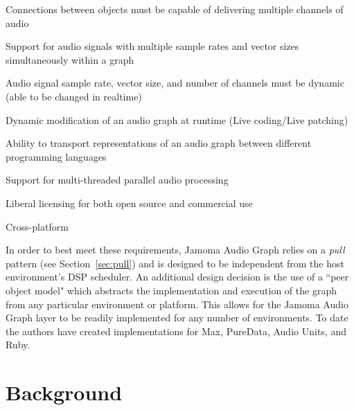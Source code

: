 \documentclass[twoside,a4paper]{article}
\newenvironment{packed_item}{
\begin{itemize}
  \setlength{\itemsep}{1pt}
  \setlength{\parskip}{0pt}
  \setlength{\parsep}{0pt}
}{\end{itemize}}
\begin{document}
\begin{packed_item}
	\item{Connections between objects must be capable of delivering multiple channels of audio}
	\item{Support for audio signals with multiple sample rates and vector sizes simultaneously within a graph}
	\item{Audio signal sample rate, vector size, and number of channels must be dynamic (able to be changed in realtime)}
	\item{Dynamic modification of an audio graph at runtime (Live coding/Live patching)}    
	\item{Ability to transport representations of an audio graph between different programming languages}
	\item{Support for multi-threaded parallel audio processing}
	\item{Liberal licensing for both open source and commercial use}
	\item{Cross-platform}
\end{packed_item}	

In order to best meet these requirements, Jamoma Audio Graph relies on a \emph{pull} pattern (see Section~\ref{sec:pull}) and is designed to be independent from the host environment's DSP scheduler.
An additional design decision is the use of a ``peer object model" which abstracts the implementation and execution of the graph from any particular environment or platform.  
This allows for the Jamoma Audio Graph layer to be readily implemented for any number of environments.
To date the authors have created implementations for Max, PureData, Audio Units, and Ruby.


%





%
\section{Background} %
%
\end{document}
